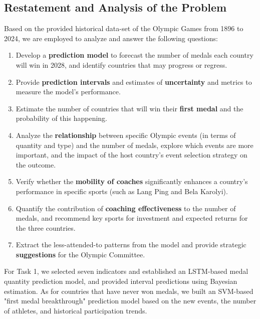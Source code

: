 \documentclass{mcmthesis}
\begin{document}
	\subsection{Restatement and Analysis of the Problem}
	Based on the provided historical data-set of the Olympic Games from 1896 to 2024, we are employed to analyze and answer the following questions:
	\begin{enumerate}
		\item 
		Develop a \textbf{prediction model} to forecast the number of medals each country will win in 2028, and identify countries that may progress or regress. 
		\item 
		Provide \textbf{prediction intervals} and estimates of \textbf{uncertainty} and metrics to measure the model's performance.
		\item 
		Estimate the number of countries that will win their \textbf{first medal} and the probability of this happening.
		\item 
		Analyze the \textbf{relationship} between specific Olympic events (in terms of quantity and type) and the number of medals, explore which events are more important, and the impact of the host country's event selection strategy on the outcome.
		\item 
		Verify whether the \textbf{mobility of coaches} significantly enhances a country's performance in specific sports (such as Lang Ping and Bela Karolyi).
		\item 
		Quantify the contribution of\textbf{ coaching effectiveness} to the number of medals, and recommend key sports for investment and expected returns for the three countries.
		\item 
		Extract the less-attended-to patterns from the model and provide strategic \textbf{suggestions} for the Olympic Committee.
	\end{enumerate}
	
	For Task 1, we selected seven indicators and established an LSTM-based medal quantity prediction model, and provided interval predictions using Bayesian estimation. As for countries that have never won medals, we built an SVM-based "first medal breakthrough" prediction model based on the new events, the number of athletes, and historical participation trends.
	
	
	
\end{document}

